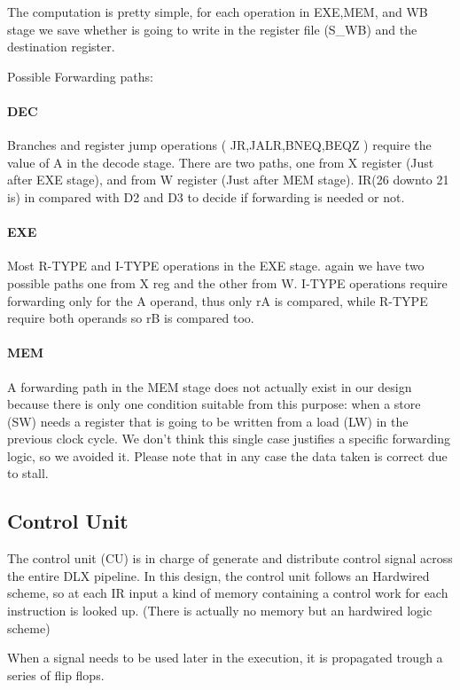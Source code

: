 \documentclass[12pt]{article}
\begin{document}
The computation is pretty simple, for each operation in EXE,MEM, and WB stage we save whether is going to write in the register file (S\_WB) and the destination register.

Possible Forwarding paths:
\paragraph{DEC} Branches and register jump operations ( JR,JALR,BNEQ,BEQZ ) require the value of A in the decode stage. There are two paths, one from X register (Just after EXE stage), and from W register (Just after MEM stage). IR(26 downto 21 is) in compared with D2 and D3 to decide if forwarding is needed or not.
\paragraph{EXE} Most R-TYPE and I-TYPE operations in the EXE stage. again we have two possible paths one from X reg and the other from W. I-TYPE operations require forwarding only for the A operand, thus only rA is compared, while R-TYPE require both operands so rB is compared too.
\paragraph{MEM} A forwarding path in the MEM stage does not actually exist in our design because there is only one condition suitable from this purpose: when a store (SW) needs a register that is going to be written from a load (LW) in the previous clock cycle.
We don't think this single case justifies a specific forwarding logic, so we avoided it. Please note that in any case the data taken is correct due to stall.

\subsection{Control Unit}
The control unit (CU) is in charge of generate and distribute control signal across the entire DLX pipeline.
In this design, the control unit follows an Hardwired scheme, so at each IR input a kind of memory containing a control work for each instruction is looked up. (There is actually no memory but an hardwired logic scheme)

When a signal needs to be used later in the execution, it is propagated trough a series of flip flops.
\end{document}
